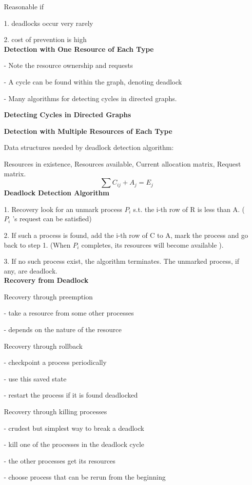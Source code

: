 \documentclass[]{report}
\begin{document}
Reasonable if

1. deadlocks occur very rarely

2. cost of prevention is high\\

\textbf{Detection with One Resource of Each Type}

- Note the resource ownership and requests

- A cycle can be found within the graph, denoting deadlock

- Many algorithms for detecting cycles in directed graphs.

\textbf{Detecting Cycles in Directed Graphs}

\textbf{Detection with Multiple Resources of Each Type}

Data structures needed by deadlock detection algorithm:

Resources in existence, Resources available, Current allocation matrix, Request matrix.
$$\sum C_{ij} + A_j = E_j$$
\textbf{Deadlock Detection Algorithm}

1. Recovery look for an unmark process $P_i$ s.t. the i-th
row of R is less than A. ($P_i$ 's request can be
satisfied)

2. If such a process is found, add the i-th row of C to
A, mark the process and go back to step 1. (When
$P_i$ completes, its resources will become available ).

3. If no such process exist, the algorithm terminates.
The unmarked process, if any, are deadlock.\\

\textbf{Recovery from Deadlock}

Recovery through preemption

- take a resource from some other processes

- depends on the nature of the resource

Recovery through rollback

- checkpoint a process periodically

- use this saved state

- restart the process if it is found deadlocked

Recovery through killing processes

- crudest but simplest way to break a deadlock

- kill one of the processes in the deadlock cycle

- the other processes get its resources

- choose process that can be rerun from the beginning\\
\end{document}
